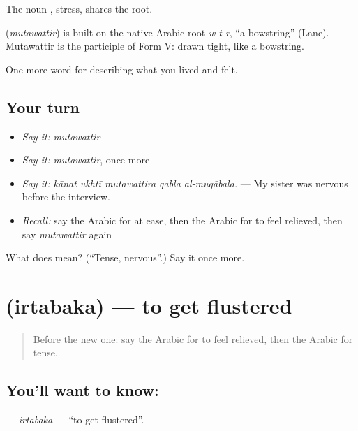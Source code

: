The noun , stress, shares the root.

\begin{cousinweb}
\textbf{} (\emph{mutawattir}) is built on the native Arabic root \emph{w-t-r}, \textquotedblleft{}a bowstring\textquotedblright{} (Lane). Mutawattir is the participle of Form V: drawn tight, like a bowstring.
\end{cousinweb}

\begin{grammarlens}[title={What you've built}]
One more word for describing what you lived and felt.
\end{grammarlens}

\subsection*{Your turn}
\begin{itemize}
\raggedright
  \item \emph{Say it:} \emph{mutawattir}
  \item \emph{Say it:} \emph{mutawattir}, once more
  \item \emph{Say it:} \emph{kānat ukhtī mutawattira qabla al-muqābala.} — My sister was nervous before the interview.
  \item \emph{Recall:} say the Arabic for at ease, then the Arabic for to feel relieved, then say \emph{mutawattir} again
\end{itemize}

\begin{tcolorbox}[breakable,colback=teal!4,colframe=teal!35!black,title={Before you move on}]
What does  mean? (\textquotedblleft{}Tense, nervous\textquotedblright{}.) Say it once more.
\end{tcolorbox}
\section[\texorpdfstring{\ar{ارتبك} (irtabaka)}{ارتبك (irtabaka)}]{ (irtabaka) — to get flustered}

\label{lesson:AR-C497-irtabaka}



\begin{quote}
Before the new one: say the Arabic for to feel relieved, then the Arabic for tense.
\end{quote}

\subsection*{You'll want to know: }
\textbf{} — \emph{irtabaka} — \textquotedblleft{}to get flustered\textquotedblright{}.


